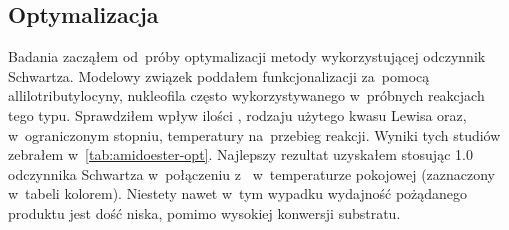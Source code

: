 \subsection{Optymalizacja}
Badania zacząłem od~próby optymalizacji metody wykorzystującej odczynnik Schwartza.
Modelowy związek  poddałem funkcjonalizacji za~pomocą
  allilotributylocyny, nukleofila często wykorzystywanego w~próbnych reakcjach tego typu.
Sprawdziłem wpływ ilości \schwartz{}, rodzaju użytego kwasu Lewisa oraz,
  w~ograniczonym stopniu, temperatury na~przebieg reakcji.
Wyniki tych studiów zebrałem w~\cref{tab:amidoester-opt}.
Najlepszy rezultat uzyskałem stosując \SI{1.0}{\equiv} odczynnika Schwartza w~połączeniu
  z~ w~temperaturze pokojowej (zaznaczony w~tabeli kolorem).
Niestety nawet w~tym wypadku wydajność pożądanego produktu jest dość niska,
  pomimo wysokiej konwersji substratu.

